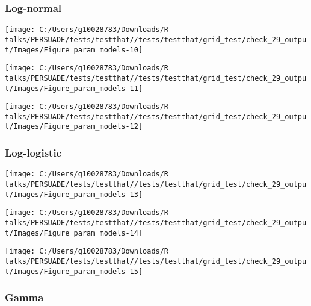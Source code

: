 \documentclass[
]{article}
\begin{document}
\subsubsection{Log-normal}\label{log-normal}

\begin{flushleft}\texttt{[image: C:/Users/g10028783/Downloads/R talks/PERSUADE/tests/testthat//tests/testthat/grid\_test/check\_29\_output/Images/Figure\_param\_models-10]} \end{flushleft}

\begin{flushleft}\texttt{[image: C:/Users/g10028783/Downloads/R talks/PERSUADE/tests/testthat//tests/testthat/grid\_test/check\_29\_output/Images/Figure\_param\_models-11]} \end{flushleft}

\begin{flushleft}\texttt{[image: C:/Users/g10028783/Downloads/R talks/PERSUADE/tests/testthat//tests/testthat/grid\_test/check\_29\_output/Images/Figure\_param\_models-12]} \end{flushleft}

\clearpage

\subsubsection{Log-logistic}\label{log-logistic}

\begin{flushleft}\texttt{[image: C:/Users/g10028783/Downloads/R talks/PERSUADE/tests/testthat//tests/testthat/grid\_test/check\_29\_output/Images/Figure\_param\_models-13]} \end{flushleft}

\begin{flushleft}\texttt{[image: C:/Users/g10028783/Downloads/R talks/PERSUADE/tests/testthat//tests/testthat/grid\_test/check\_29\_output/Images/Figure\_param\_models-14]} \end{flushleft}

\begin{flushleft}\texttt{[image: C:/Users/g10028783/Downloads/R talks/PERSUADE/tests/testthat//tests/testthat/grid\_test/check\_29\_output/Images/Figure\_param\_models-15]} \end{flushleft}

\clearpage

\subsubsection{Gamma}\label{gamma}
\end{document}

